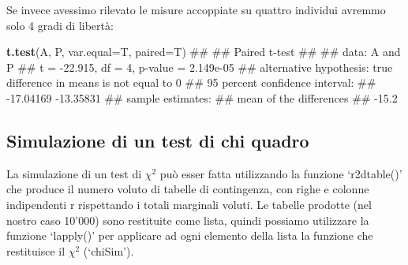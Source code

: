 \documentclass[a4paper,12pt,oneside]{book}
\newenvironment{Shaded}{\begin{snugshade}}{\end{snugshade}}
\newcommand{\KeywordTok}[1]{\textcolor[rgb]{0.13,0.29,0.53}{\textbf{#1}}}
\newcommand{\DataTypeTok}[1]{\textcolor[rgb]{0.13,0.29,0.53}{#1}}
\newcommand{\DecValTok}[1]{\textcolor[rgb]{0.00,0.00,0.81}{#1}}
\newcommand{\FloatTok}[1]{\textcolor[rgb]{0.00,0.00,0.81}{#1}}
\newcommand{\StringTok}[1]{\textcolor[rgb]{0.31,0.60,0.02}{#1}}
\newcommand{\ControlFlowTok}[1]{\textcolor[rgb]{0.13,0.29,0.53}{\textbf{#1}}}
\newcommand{\OperatorTok}[1]{\textcolor[rgb]{0.81,0.36,0.00}{\textbf{#1}}}
\newcommand{\NormalTok}[1]{#1}
\theoremstyle{definition}
\theoremstyle{definition}
\theoremstyle{definition}
\theoremstyle{remark}
\begin{document}
Se invece avessimo rilevato le misure accoppiate su quattro individui
avremmo solo 4 gradi di libertà:

\begin{Shaded}
\begin{Highlighting}[]
\KeywordTok{t.test}\NormalTok{(A, P, }\DataTypeTok{var.equal=}\NormalTok{T, }\DataTypeTok{paired=}\NormalTok{T)}
\NormalTok{## }
\NormalTok{##  Paired t-test}
\NormalTok{## }
\NormalTok{## data:  A and P}
\NormalTok{## t = -22.915, df = 4, p-value = 2.149e-05}
\NormalTok{## alternative hypothesis: true difference in means is not equal to 0}
\NormalTok{## 95 percent confidence interval:}
\NormalTok{##  -17.04169 -13.35831}
\NormalTok{## sample estimates:}
\NormalTok{## mean of the differences }
\NormalTok{##                   -15.2}
\end{Highlighting}
\end{Shaded}

\subsection{Simulazione di un test di chi
quadro}\label{simulazione-di-un-test-di-chi-quadro}

La simulazione di un test di \(\chi^2\) può esser fatta utilizzando la
funzione `r2dtable()' che produce il numero voluto di tabelle di
contingenza, con righe e colonne indipendenti r rispettando i totali
marginali voluti. Le tabelle prodotte (nel nostro caso 10'000) sono
restituite come lista, quindi possiamo utilizzare la funzione `lapply()'
per applicare ad ogni elemento della lista la funzione che restituisce
il \(\chi^2\) (`chiSim').

\begin{Shaded}
\end{Shaded}
\end{document}
